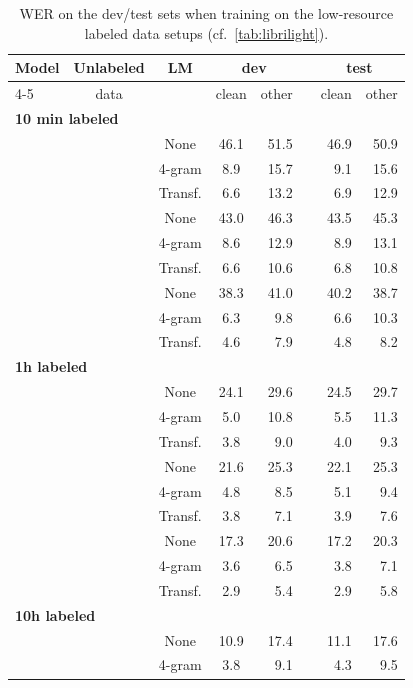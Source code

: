 \documentclass{article}
\begin{document}
\begin{table}[h]
\caption{WER on the \libri{} dev/test sets when training on the \libril{} low-resource labeled data setups (cf.~\autoref{tab:librilight}).
}
\label{tab:librilight_full}
\centering 
\begin{tabular}{lcccrrrr}
\toprule
\multirow{2}{*}{Model} & Unlabeled & \multirow{2}{*}{LM} & \multicolumn{2}{c}{dev} && \multicolumn{2}{c}{test} \\
\cline{4-5}\cline{7-8} 
{} & data & {} & clean & other && clean & other \\
\midrule
\midrule
\multicolumn{8}{l}{\textbf{10 min labeled}}\\
\wvppbase{} & \librisz{} & None & 46.1 & 51.5 && 46.9 & 50.9 \\
&& 4-gram & 8.9 & 15.7 && 9.1 & 15.6 \\
&& Transf. & 6.6 & 13.2 && 6.9 & 12.9 \\
\wvppbig{} & \librisz{} & None & 43.0 & 46.3 && 43.5 & 45.3 \\
&& 4-gram & 8.6 & 12.9 && 8.9 & 13.1 \\
&& Transf. & 6.6 & 10.6 && 6.8 & 10.8 \\
\wvppbig{} & \voxsz{} & None & 38.3 & 41.0 && 40.2 & 38.7 \\
&& 4-gram & 6.3 & 9.8 && 6.6 & 10.3 \\
&& Transf. & 4.6 & 7.9 && 4.8 & 8.2 \\
\midrule
\midrule
\multicolumn{8}{l}{\textbf{1h labeled}}\\
\wvppbase{} & \librisz{} & None & 24.1 & 29.6 && 24.5 & 29.7 \\
&& 4-gram & 5.0 & 10.8 && 5.5 & 11.3 \\
&& Transf. & 3.8 & 9.0 && 4.0 & 9.3 \\
\wvppbig{} & \librisz{} & None & 21.6 & 25.3 && 22.1 & 25.3 \\
&& 4-gram & 4.8 & 8.5 && 5.1 & 9.4 \\
&& Transf. & 3.8 & 7.1 && 3.9 & 7.6 \\
\wvppbig{} & \voxsz{} & None & 17.3 & 20.6 && 17.2 & 20.3 \\
&& 4-gram & 3.6 & 6.5 && 3.8 & 7.1 \\
&& Transf. & 2.9 & 5.4 && 2.9 & 5.8 \\
\midrule
\midrule
\multicolumn{8}{l}{\textbf{10h labeled}}\\
\wvppbase{} & \librisz{} & None & 10.9 & 17.4 && 11.1 & 17.6 \\
&& 4-gram & 3.8 & 9.1 && 4.3 & 9.5 \\

\end{tabular}
\end{table}
\end{document}
